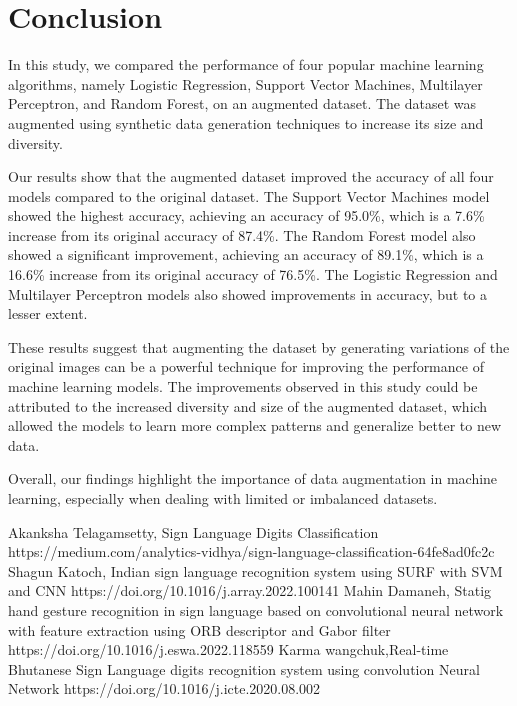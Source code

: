 \documentclass[conference]{IEEEtran}
\begin{document}
\section{Conclusion}

In this study, we compared the performance of four popular machine learning algorithms, namely Logistic Regression, Support Vector Machines, Multilayer Perceptron, and Random Forest, on an augmented dataset. The dataset was augmented using synthetic data generation techniques to increase its size and diversity.

Our results show that the augmented dataset improved the accuracy of all four models compared to the original dataset. The Support Vector Machines model showed the highest accuracy, achieving an accuracy of 95.0\%, which is a 7.6\% increase from its original accuracy of 87.4\%. The Random Forest model also showed a significant improvement, achieving an accuracy of 89.1\%, which is a 16.6\% increase from its original accuracy of 76.5\%. The Logistic Regression and Multilayer Perceptron models also showed improvements in accuracy, but to a lesser extent.

These results suggest that augmenting the dataset by generating variations of the original images can be a powerful technique for improving the performance of machine learning models. The improvements observed in this study could be attributed to the increased diversity and size of the augmented dataset, which allowed the models to learn more complex patterns and generalize better to new data.

Overall, our findings highlight the importance of data augmentation in machine learning, especially when dealing with limited or imbalanced datasets.


\begin{thebibliography}{00}
     Akanksha Telagamsetty, Sign Language Digits Classification https://medium.com/analytics-vidhya/sign-language-classification-64fe8ad0fc2c
     Shagun Katoch, Indian sign language recognition system using SURF with SVM and CNN https://doi.org/10.1016/j.array.2022.100141
     Mahin Damaneh, Statig hand gesture recognition in sign language based on convolutional neural network with feature extraction using ORB descriptor and Gabor filter https://doi.org/10.1016/j.eswa.2022.118559
     Karma wangchuk,Real-time Bhutanese Sign Language digits recognition system using convolution Neural Network https://doi.org/10.1016/j.icte.2020.08.002
\end{thebibliography}
\end{document}
